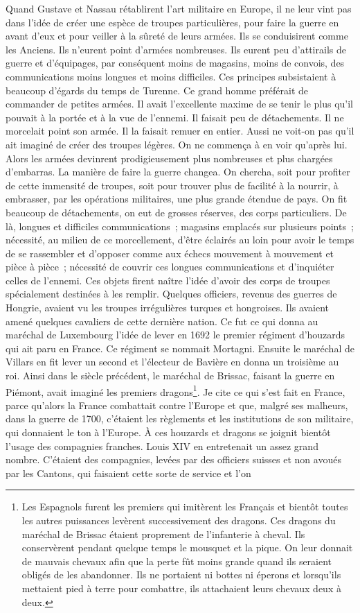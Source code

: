 \documentclass[french,twoside]{book} %
\begin{document}
Quand Gustave et Nassau rétablirent l’art militaire en Europe, il ne leur vint pas dans l’idée de créer une espèce de troupes particulières, pour faire la guerre en avant d’eux et pour veiller à la sûreté de leurs armées. Ils se conduisirent comme les Anciens. Ils n’eurent point d’armées nombreuses. Ils eurent peu d’attirails de guerre et d’équipages, par conséquent moins de magasins, moins de convois, des communications moins longues et moins difficiles. Ces principes subsistaient à beaucoup d’égards du temps de Turenne. Ce grand homme préférait de commander de petites armées. Il avait l’excellente maxime de se tenir le plus qu’il pouvait à la portée et à la vue de l’ennemi. Il faisait peu de détachements. Il ne morcelait point son armée. Il la faisait remuer en entier. Aussi ne voit-on pas qu’il ait imaginé de créer des troupes légères. On ne commença à en voir qu’après lui. Alors les armées devinrent prodigieusement plus nombreuses et plus chargées d’embarras. La manière de faire la guerre changea. On chercha, soit pour profiter de cette immensité de troupes, soit pour trouver plus de facilité à la nourrir, à embrasser, par les opérations militaires, une plus grande étendue de pays. On fit beaucoup de détachements, on eut de grosses réserves, des corps particuliers. De là, longues et difficiles communications ; magasins emplacés sur plusieurs points ; nécessité, au milieu de ce morcellement, d’être éclairés au loin pour avoir le temps de se rassembler et d’opposer comme aux échecs mouvement à mouvement et pièce à pièce ; nécessité de couvrir ces longues communications et d’inquiéter celles de l’ennemi. Ces objets firent naître l’idée d’avoir des corps de troupes spécialement destinées à les remplir. Quelques officiers, revenus des guerres de Hongrie, avaient vu les troupes irrégulières turques et hongroises. Ils avaient amené quelques cavaliers de cette dernière nation. Ce fut ce qui donna au maréchal de Luxembourg l’idée de lever en 1692 le premier régiment d’houzards qui ait paru en France. Ce régiment se nommait Mortagni. Ensuite le maréchal de Villars en fit lever un second et l’électeur de Bavière en donna un troisième au roi. Ainsi dans le siècle précédent, le maréchal de Brissac, faisant la guerre en Piémont, avait imaginé les premiers dragons\footnote{Les Espagnols furent les premiers qui imitèrent les Français et bientôt toutes les autres puissances levèrent successivement des dragons. Ces dragons du maréchal de Brissac étaient proprement de l’infanterie à cheval. Ils conservèrent pendant quelque temps le mousquet et la pique. On leur donnait de mauvais chevaux afin que la perte fût moins grande quand ils seraient obligés de les abandonner. Ils ne portaient ni bottes ni éperons et lorsqu’ils mettaient pied à terre pour combattre, ils attachaient leurs chevaux deux à deux.}. Je cite ce qui s’est fait en France, parce qu’alors la France combattait contre l’Europe et que, malgré ses malheurs, dans la guerre de 1700, c’étaient les règlements et les institutions de son militaire, qui donnaient le ton à l’Europe. À ces houzards et dragons se joignit bientôt l’usage des compagnies franches. Louis XIV en entretenait un assez grand nombre. C’étaient des compagnies, levées par des officiers suisses et non avoués par les Cantons, qui faisaient cette sorte de service et l’on 
\end{document}
